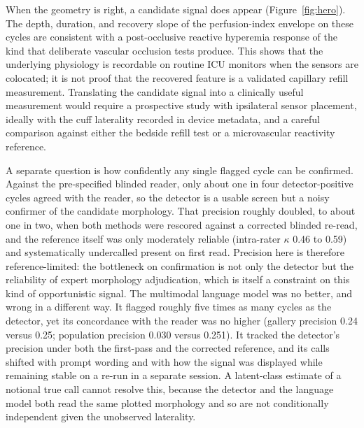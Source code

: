 \documentclass[twocolumn,letterpaper,10pt]{article}
\begin{document}
When the geometry is right, a candidate signal does appear (Figure~\ref{fig:hero}). The depth, duration, and recovery slope of the perfusion-index envelope on these cycles are consistent with a post-occlusive reactive hyperemia response of the kind that deliberate vascular occlusion tests produce.\cite{menezes2018_pi_septic,menezes2019_pi_vot_mortality,sun2024_pi_review} This shows that the underlying physiology is recordable on routine ICU monitors when the sensors are colocated; it is not proof that the recovered feature is a validated capillary refill measurement. Translating the candidate signal into a clinically useful measurement would require a prospective study with ipsilateral sensor placement, ideally with the cuff laterality recorded in device metadata, and a careful comparison against either the bedside refill test or a microvascular reactivity reference.

A separate question is how confidently any single flagged cycle can be confirmed. Against the pre-specified blinded reader, only about one in four detector-positive cycles agreed with the reader, so the detector is a usable screen but a noisy confirmer of the candidate morphology. That precision roughly doubled, to about one in two, when both methods were rescored against a corrected blinded re-read, and the reference itself was only moderately reliable (intra-rater $\kappa$ 0.46 to 0.59) and systematically undercalled present on first read. Precision here is therefore reference-limited: the bottleneck on confirmation is not only the detector but the reliability of expert morphology adjudication, which is itself a constraint on this kind of opportunistic signal. The multimodal language model was no better, and wrong in a different way.\cite{stelling2026_mllm_ecg} It flagged roughly five times as many cycles as the detector, yet its concordance with the reader was no higher (gallery precision 0.24 versus 0.25; population precision 0.030 versus 0.251). It tracked the detector's precision under both the first-pass and the corrected reference, and its calls shifted with prompt wording and with how the signal was displayed while remaining stable on a re-run in a separate session. A latent-class estimate of a notional true call cannot resolve this, because the detector and the language model both read the same plotted morphology and so are not conditionally independent given the unobserved laterality.\cite{hui1980_latent_class,reitsma2009_imperfect_reference,rutjes2007_no_gold_standard}
\end{document}
